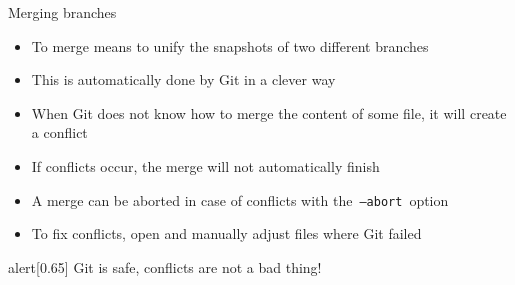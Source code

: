 \documentclass[usenames,svgnames,14pt]{beamer}
\begin{document}
\begin{frame}{Merging branches}
    \setlength{\leftmargini}{0.6cm}
    \begin{itemize}
        \item To merge means to unify the snapshots of two different branches
        \item This is automatically done by Git in a clever way
        \item When Git does not know how to merge the content of some file, it will create a conflict
        \item If conflicts occur, the merge will not automatically finish
        \item A merge can be aborted in case of conflicts with the \,\texttt{--abort}\, option
        \item To fix conflicts, open and manually adjust files where Git failed
    \end{itemize}
    \medskip
    \begin{varblock}{alert}[0.65\textwidth]{}
        \alert{Git is safe, conflicts are not a bad thing!}
    \end{varblock}
\end{frame}
\newcommand{\commits}[2]{%
    \draw[very thick] (#1) -- ($(#1)+(2.5,0)$) edge[out=0, in=180] ($(#1)+(3.5,1)$);
    \draw[very thick] ($(#1)+(3.5,1)$) -- ($(#1)+(5,1)$);
    \foreach \dx/\dy [count=\i from 1] in {0/0, 1/0, 2/0, 4/1, 5/1}{
        \ifnum\i=#2
            \def\col{PS!50}
        \else
            \def\col{white}
        \fi
        \node[commit=\col] (C\i) at ($(#1)+(\dx,\dy)$) {};
    }
}
\end{document}
